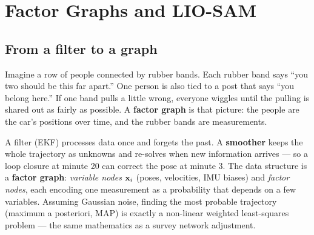 \chapter{Factor Graphs and LIO-SAM}

\section{From a filter to a graph}
\begin{kid}
Imagine a row of people connected by rubber bands. Each rubber band says ``you two should be this far apart.'' One person is also tied to a post that says ``you belong here.'' If one band pulls a little wrong, everyone wiggles until the pulling is shared out as fairly as possible. A \textbf{factor graph} is that picture: the people are the car's positions over time, and the rubber bands are measurements.
\end{kid}


\begin{eng}
A filter (EKF) processes data once and forgets the past. A \textbf{smoother} keeps the whole trajectory as unknowns and re-solves when new information arrives --- so a loop closure at minute 20 can correct the pose at minute 3. The data structure is a \textbf{factor graph}: \emph{variable nodes} $\mathbf{x}_i$ (poses, velocities, IMU biases) and \emph{factor nodes}, each encoding one measurement as a probability that depends on a few variables. Assuming Gaussian noise, finding the most probable trajectory (maximum a posteriori, MAP) is exactly a non-linear weighted least-squares problem --- the same mathematics as a survey network adjustment.
\end{eng}


